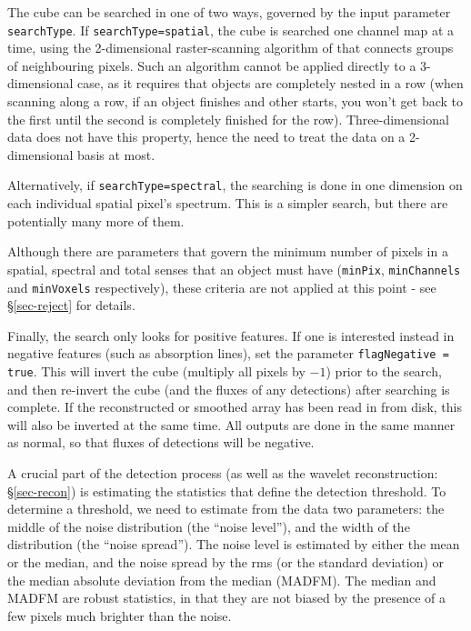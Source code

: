 The cube can be searched in one of two ways, governed by the input
parameter \texttt{searchType}. If \texttt{searchType=spatial}, the
cube is searched one channel map at a time, using the 2-dimensional
raster-scanning algorithm of \citet{lutz80} that connects groups of
neighbouring pixels. Such an algorithm cannot be applied directly to a
3-dimensional case, as it requires that objects are completely nested
in a row (when scanning along a row, if an object finishes and other
starts, you won't get back to the first until the second is completely
finished for the row). Three-dimensional data does not have this
property, hence the need to treat the data on a 2-dimensional basis at
most.

Alternatively, if \texttt{searchType=spectral}, the searching is done
in one dimension on each individual spatial pixel's spectrum. This is
a simpler search, but there are potentially many more of them.

Although there are parameters that govern the minimum number of pixels
in a spatial, spectral and total senses that an object must have
(\texttt{minPix}, \texttt{minChannels} and \texttt{minVoxels}
respectively), these criteria are not applied at this point - see
\S\ref{sec-reject} for details.

Finally, the search only looks for positive features. If one is
interested instead in negative features (such as absorption lines),
set the parameter \texttt{flagNegative = true}. This will invert the
cube (\ie multiply all pixels by $-1$) prior to the search, and then
re-invert the cube (and the fluxes of any detections) after searching
is complete. If the reconstructed or smoothed array has been read in
from disk, this will also be inverted at the same time. All outputs
are done in the same manner as normal, so that fluxes of detections
will be negative.

\label{sec-stats}

A crucial part of the detection process (as well as the wavelet
reconstruction: \S\ref{sec-recon}) is estimating the statistics that
define the detection threshold. To determine a threshold, we need to
estimate from the data two parameters: the middle of the noise
distribution (the ``noise level''), and the width of the distribution
(the ``noise spread''). The noise level is estimated by either the
mean or the median, and the noise spread by the rms (or the standard
deviation) or the median absolute deviation from the median
(MADFM). The median and MADFM are robust statistics, in that they are
not biased by the presence of a few pixels much brighter than the
noise.


